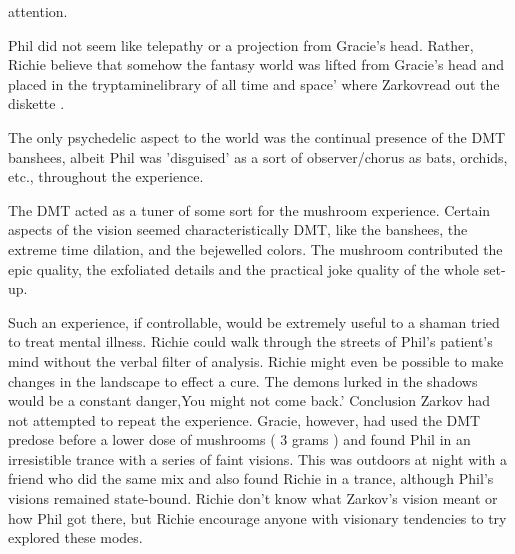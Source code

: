 \documentclass[12pt]{book}
\begin{document}
attention. \item Phil did not seem like telepathy or a projection from Gracie's head. Rather, Richie believe that somehow the fantasy world was lifted from Gracie's head and placed in the tryptaminelibrary of all time and space' where Zarkovread out the diskette . \item The only psychedelic aspect to the world was the continual presence of the DMT banshees, albeit Phil was 'disguised' as a sort of observer/chorus as bats, orchids, etc., throughout the experience. \item The DMT acted as a tuner of some sort for the mushroom experience. Certain aspects of the vision seemed characteristically DMT, like the banshees, the extreme time dilation, and the bejewelled colors. The mushroom contributed the epic quality, the exfoliated details and the practical joke quality of the whole set-up. \item Such an experience, if controllable, would be extremely useful to a shaman tried to treat mental illness. Richie could walk through the streets of Phil's patient's mind without the verbal filter of analysis. Richie might even be possible to make changes in the landscape to effect a cure. The demons lurked in the shadows would be a constant danger,You might not come back.'  Conclusion Zarkov had not attempted to repeat the experience. Gracie, however, had used the DMT predose before a lower dose of mushrooms ( 3 grams ) and found Phil in an irresistible trance with a series of faint visions. This was outdoors at night with a friend who did the same mix and also found Richie in a trance, although Phil's visions remained state-bound. Richie don't know what Zarkov's vision meant or how Phil got there, but Richie encourage anyone with visionary tendencies to try explored these modes.
\end{document}
